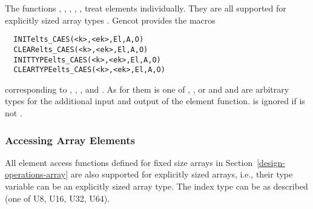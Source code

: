 The functions , , , , , 
 treat elements individually. They are all supported for explicitly sized array types . 
Gencot provides the macros
\begin{verbatim}
  INITelts_CAES(<k>,<ek>,El,A,O)
  CLEARelts_CAES(<k>,<ek>,El,A,O)
  INITTYPEelts_CAES(<k>,<ek>,El,A,O)
  CLEARTYPEelts_CAES(<k>,<ek>,El,A,O)
\end{verbatim}
corresponding to , , , and . As for them
 is one of , , or  and  and  are arbitrary types for the 
additional input and output of the element function.  is ignored if  is not .

\subsubsection{Accessing Array Elements}

All element access functions defined for fixed size arrays in Section~\ref{design-operations-array} are also supported for 
explicitly sized arrays, i.e., their type variable  can be an explicitly sized array type. The index type 
can be as described (one of U8, U16, U32, U64).
